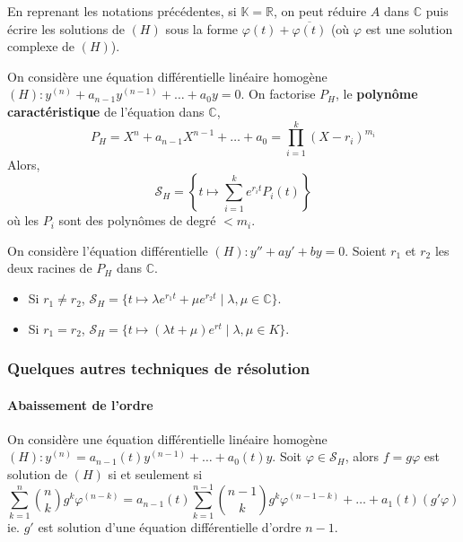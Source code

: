   \begin{remark}
    En reprenant les notations précédentes, si $\mathbb{K} = \mathbb{R}$, on peut réduire $A$ dans $\mathbb{C}$ puis écrire les solutions de $(H)$ sous la forme $\varphi(t) + \overline{\varphi(t)}$ (où $\varphi$ est une solution complexe de $(H)$).
  \end{remark}

  \begin{corollary}
    On considère une équation différentielle linéaire homogène $(H) : y^{(n)} + a_{n-1} y^{(n-1)} + \dots + a_0 y = 0$. On factorise $P_H$, le \textbf{polynôme caractéristique} de l'équation dans $\mathbb{C}$,
    \[ P_H = X^n + a_{n-1}X^{n-1} + \dots + a_0 = \prod_{i=1}^k (X-r_i)^{m_i} \]
    Alors,
    \[ \mathcal{S}_H = \left\{t \mapsto \sum_{i=1}^k e^{r_i t} P_i(t)\right\} \]
    où les $P_i$ sont des polynômes de degré $< m_i$.
  \end{corollary}

  \begin{example}
    On considère l'équation différentielle $(H) : y'' + ay' + by = 0$. Soient $r_1$ et $r_2$ les deux racines de $P_H$ dans $\mathbb{C}$.
    \begin{itemize}
      \item Si $r_1 \neq r_2$, $\mathcal{S}_H = \{t \mapsto \lambda e^{r_1 t} + \mu e^{r_2 t} \mid \lambda, \mu \in \mathbb{C}\}$.
      \item Si $r_1 = r_2$, $\mathcal{S}_H = \{t \mapsto (\lambda t + \mu) e^{r t} \mid \lambda, \mu \in K\}$.
    \end{itemize}
  \end{example}

  \subsubsection{Quelques autres techniques de résolution}

  \paragraph{Abaissement de l'ordre}

  \begin{proposition}
    On considère une équation différentielle linéaire homogène $(H) : y^{(n)} = a_{n-1}(t) y^{(n-1)} + \dots + a_0(t) y$. Soit $\varphi \in \mathcal{S}_H$, alors $f = g \varphi$ est solution de $(H)$ si et seulement si
    \[ \sum_{k=1}^n \binom{n}{k} g^{k} \varphi^{(n-k)} = a_{n-1}(t) \sum_{k=1}^{n-1} \binom{n-1}{k} g^{k} \varphi^{(n-1-k)} + \dots + a_1(t) (g' \varphi) \]
    ie. $g'$ est solution d'une équation différentielle d'ordre $n-1$.
  \end{proposition}

